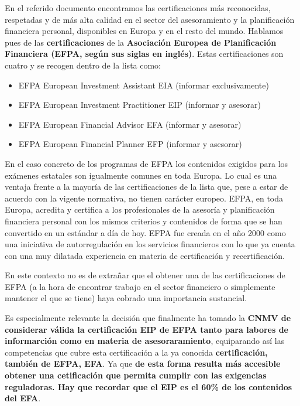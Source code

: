 \documentclass[
  letterpaper,
  DIV=11,
  numbers=noendperiod]{scrreprt}
\begin{document}
En el referido documento encontramos las certificaciones más
reconocidas, respetadas y de más alta calidad en el sector del
asesoramiento y la planificación financiera personal, disponibles en
Europa y en el resto del mundo. Hablamos pues de las
\textbf{certificaciones} de la \textbf{Asociación Europea de
Planificación Financiera (EFPA, según sus siglas en inglés)}. Estas
certificaciones son cuatro y se recogen dentro de la lista como:

\begin{itemize}
\item
  EFPA European Investment Assistant EIA (informar exclusivamente)
\item
  EFPA European Investment Practitioner EIP (informar y asesorar)
\item
  EFPA European Financial Advisor EFA (informar y asesorar)
\item
  EFPA European Financial Planner EFP (informar y asesorar)
\end{itemize}

En el caso concreto de los programas de EFPA los contenidos exigidos
para los exámenes estatales son igualmente comunes en toda Europa. Lo
cual es una ventaja frente a la mayoría de las certificaciones de la
lista que, pese a estar de acuerdo con la vigente normativa, no tienen
carácter europeo. EFPA, en toda Europa, acredita y certifica a los
profesionales de la asesoría y planificación financiera personal con los
mismos criterios y contenidos de forma que se han convertido en un
estándar a día de hoy. EFPA fue creada en el año 2000 como una
iniciativa de autorregulación en los servicios financieros con lo que ya
cuenta con una muy dilatada experiencia en materia de certificación y
recertificación.

En este contexto no es de extrañar que el obtener una de las
certificaciones de EFPA (a la hora de encontrar trabajo en el sector
financiero o simplemente mantener el que se tiene) haya cobrado una
importancia sustancial.

Es especialmente relevante la decisión que finalmente ha tomado la
\textbf{CNMV de considerar válida la certificación EIP de EFPA tanto
para labores de informarción como en materia de asesoraramiento},
equiparando así las competencias que cubre esta certificación a la ya
conocida \textbf{certificación, también de EFPA, EFA}. Ya que \textbf{de
esta forma resulta más accesible obtener una cetificación que permita
cumplir con las exigencias reguladoras. Hay que recordar que el EIP es
el 60\% de los contenidos del EFA}.
\end{document}
